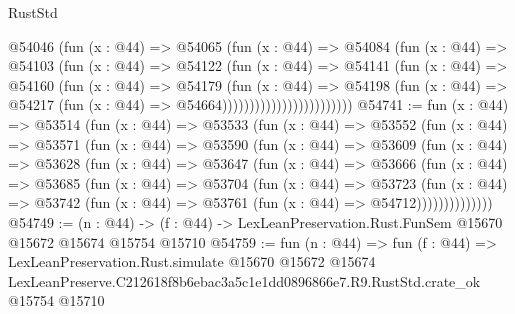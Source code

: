 \begin{lexlean}{RustStd}
\begin{coremodule}
                              @54046
                                (fun (x : @44) =>
                                @54065
                                  (fun (x : @44) =>
                                  @54084
                                    (fun (x : @44) =>
                                    @54103
                                      (fun (x : @44) =>
                                      @54122
                                        (fun (x : @44) =>
                                        @54141
                                          (fun (x : @44) =>
                                          @54160
                                            (fun (x : @44) =>
                                            @54179
                                              (fun (x : @44) =>
                                              @54198
                                                (fun (x : @44) =>
                                                @54217
                                                  (fun (x : @44) => @54664))))))))))))))))))))))))
@54741 := fun (x : @44) =>
  @53514
    (fun (x : @44) =>
    @53533
      (fun (x : @44) =>
      @53552
        (fun (x : @44) =>
        @53571
          (fun (x : @44) =>
          @53590
            (fun (x : @44) =>
            @53609
              (fun (x : @44) =>
              @53628
                (fun (x : @44) =>
                @53647
                  (fun (x : @44) =>
                  @53666
                    (fun (x : @44) =>
                    @53685
                      (fun (x : @44) =>
                      @53704
                        (fun (x : @44) =>
                        @53723
                          (fun (x : @44) =>
                          @53742 (fun (x : @44) => @53761 (fun (x : @44) => @54712))))))))))))))
@54749 := (n : @44) ->
  (f : @44) -> LexLeanPreservation.Rust.FunSem @15670 @15672 @15674 @15754 @15710
@54759 := fun (n : @44) =>
  fun (f : @44) =>
  LexLeanPreservation.Rust.simulate
    @15670
    @15672
    @15674
    LexLeanPreserve.C212618f8b6ebac3a5c1e1dd0896866e7.R9.RustStd.crate_ok
    @15754
    @15710
\end{coremodule}
\end{lexlean}
